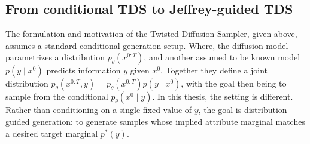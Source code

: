 \begin{algorithm}[H]
\caption{Twisted Diffusion Sampler (TDS)}
\label{alg:tds}

\end{algorithm}
\subsection{From conditional TDS to Jeffrey-guided TDS}
The formulation and motivation of the Twisted Diffusion Sampler, given above, assumes a standard conditional generation setup. Where, the diffusion model parametrizes a distribution $p_\theta(x^{0:T})$, and another assumed to be known model $p(y \mid x^0)$ predicts information $y$ given $x^0$. Together they define a joint distribution $p_\theta(x^{0:T},y) = p_\theta(x^{0:T})p(y \mid x^0)$, with the goal then being to sample from the conditional $p_\theta(x^0 \mid y)$. In this thesis, the setting is different. Rather than conditioning on a single fixed value of $y$, the goal is distribution-guided generation: to generate samples whose implied attribute marginal matches a desired target marginal $p^*(y)$.

